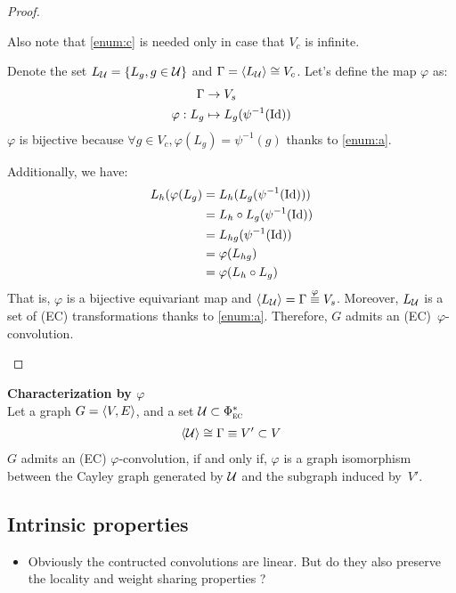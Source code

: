 \begin{proof}
\begin{enumerate}
Also note that \ref{enum:c} is needed only in case that $V_c$ is infinite.

Denote the set $L_{\mathcal{U}} = \{L_g, g \in \mathcal{U} \}$ and $\Gamma = \langle L_{\mathcal{U}} \rangle \cong V_c$. Let's define the map $\varphi$ as:
\begin{align*}
\Gamma & \rightarrow V_s\\
\varphi: L_g & \mapsto L_g(\psi^{-1}(\operatorname{Id}))
\end{align*}
$\varphi$ is bijective because $\forall g \in V_c, \varphi(L_g) = \psi^{-1}(g)$ thanks to \ref{enum:a}.

Additionally, we have:
\begin{align*}
L_h(\varphi(L_g) & = L_h(L_g(\psi^{-1}(\operatorname{Id})))\\
 & = L_h \circ L_g(\psi^{-1}(\operatorname{Id}))\\
 & = L_{hg}(\psi^{-1}(\operatorname{Id}))\\
 & = \varphi(L_{hg})\\
 & = \varphi(L_h \circ L_g)
\end{align*}
That is, $\varphi$ is a bijective equivariant map and $ \langle L_{\mathcal{U}} \rangle = \Gamma \overset{\varphi}{\equiv} V_s$. Moreover, $L_{\mathcal{U}}$ is a set of (EC) transformations thanks to \ref{enum:a}. Therefore, $G$ admits an (EC)~$\varphi$-convolution.
\end{enumerate}
\end{proof}

\begin{corrolary}\textbf{Characterization by $\varphi$}\\
Let a graph $G = \langle V, E \rangle$, and a set $\mathcal{U} \subset \Phi^*_{\operatorname{\textsc{ec}}}$ \st
\begin{gather*}
\langle \mathcal{U} \rangle \cong \Gamma \equiv V' \subset V
\end{gather*}
$G$ admits an (EC) $\varphi$-convolution, if and only if, $\varphi$ is a graph isomorphism between the Cayley graph generated by $\mathcal{U}$ and the subgraph induced by~$V'$.
\label{cor:cayley}
\end{corrolary}

\subsection{Intrinsic properties}

\begin{itemize}
  \item Obviously the contructed convolutions are linear. But do they also preserve the locality and weight sharing properties ?
\end{itemize}

